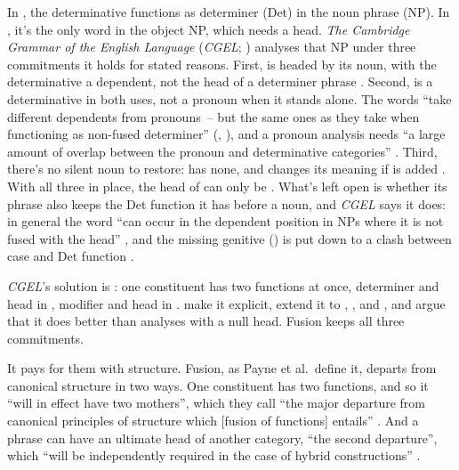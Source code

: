 \documentclass[12pt]{article}
\begin{document}
In , the determinative  functions as determiner (Det) in the noun phrase (NP). In , it's the only word in the object NP, which needs a head. \textit{The Cambridge Grammar of the English Language} (\textit{CGEL}; \citealp{huddleston2002}) analyses that NP under three commitments it holds for stated reasons. First,  is headed by its noun, with the determinative a dependent, not the head of a determiner phrase \citep{pullummiller2022nps,bruening2020nominal}. Second,  is a determinative in both uses, not a pronoun when it stands alone. The words \enquote{take different dependents from pronouns~-- but the same ones as they take when functioning as non-fused determiner} (, ), and a pronoun analysis needs \enquote{a large amount of overlap between the pronoun and determinative categories} \citep[420--421]{huddleston2002}. Third, there's no silent noun to restore:  has none, and  changes its meaning if  is added \citep[420--421]{huddleston2002}. With all three in place, the head of  can only be . What's left open is whether its phrase also keeps the Det function it has before a noun, and \textit{CGEL} says it does: in general the word \enquote{can occur in the dependent position in NPs where it is not fused with the head} \citep[410]{huddleston2002}, and the missing genitive () is put down to a clash between case and Det function \citep[420]{huddleston2002}.

\textit{CGEL}'s solution is : one constituent has two functions at once, determiner and head in , modifier and head in  \citep[410--421]{huddleston2002}. \textcite{Payne2007} make it explicit, extend it to , , and , and argue that it does better than analyses with a null head. Fusion keeps all three commitments.

It pays for them with structure. Fusion, as Payne et al.\ define it, departs from canonical structure in two ways. One constituent has two functions, and so it \enquote{will in effect have two mothers}, which they call \enquote{the major departure from canonical principles of structure which [fusion of functions] entails} \citep[570--571]{Payne2007}. And a phrase can have an ultimate head of another category, \enquote{the second departure}, which \enquote{will be independently required in the case of hybrid constructions} \citep[571]{Payne2007}.
\end{document}
